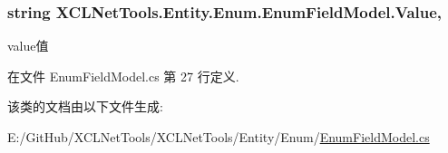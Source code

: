\subsubsection[{\texorpdfstring{Value}{Value}}]{\setlength{\rightskip}{0pt plus 5cm}string X\+C\+L\+Net\+Tools.\+Entity.\+Enum.\+Enum\+Field\+Model.\+Value\hspace{0.3cm}{\ttfamily [get]}, {\ttfamily [set]}}\hypertarget{class_x_c_l_net_tools_1_1_entity_1_1_enum_1_1_enum_field_model_aa2c519a0507eff410068ee108e7ed845}{}\label{class_x_c_l_net_tools_1_1_entity_1_1_enum_1_1_enum_field_model_aa2c519a0507eff410068ee108e7ed845}


value值 



在文件 Enum\+Field\+Model.\+cs 第 27 行定义.



该类的文档由以下文件生成\+:\begin{DoxyCompactItemize}
\item 
E\+:/\+Git\+Hub/\+X\+C\+L\+Net\+Tools/\+X\+C\+L\+Net\+Tools/\+Entity/\+Enum/\hyperlink{_enum_field_model_8cs}{Enum\+Field\+Model.\+cs}\end{DoxyCompactItemize}
